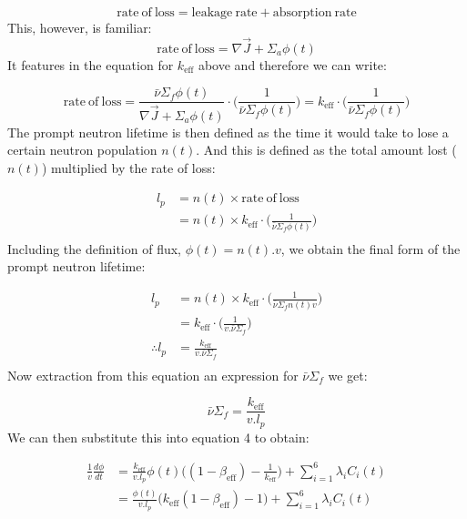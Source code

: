 \documentclass[11pt,letterpaper,titlepage]{article}
\begin{document}
$$
\mathrm{rate \ of \ loss} = \mathrm{leakage \ rate + absorption \ rate}
$$
\noindent
This, however, is familiar:
$$
\mathrm{rate \ of \ loss} = \nabla \vec{J} + \Sigma_a \phi(t)
$$
\noindent
It features in the equation for $k_{\mathrm{eff}}$ above and therefore we can write:

$$
\mathrm{rate \ of \ loss}=\frac{\bar{\nu} \Sigma_f \phi (t) }{\nabla \vec{J} + \Sigma_a \phi(t)}\cdot \biggr(   \frac{1}{\bar{\nu} \Sigma_f \phi (t)}  \biggr) = k_{\mathrm{eff}}\cdot \biggr(   \frac{1}{\bar{\nu} \Sigma_f \phi (t)}  \biggr)
$$
The prompt neutron lifetime is then defined as the time it would take to lose a certain neutron population $n(t)$. And this is defined as the total amount lost ($n(t)$) multiplied by the rate of loss:

\begin{equation*}
\begin{aligned}
l_p &=n(t)\times \mathrm{rate \ of \ loss} \\
    &=n(t)\times k_{\mathrm{eff}}\cdot \biggr(   \frac{1}{\bar{\nu} \Sigma_f \phi (t)}  \biggr)\\
\end{aligned}
\end{equation*}
\noindent
Including the definition of flux, $\phi(t)=n(t).v$, we obtain the final form of the prompt neutron lifetime:

\begin{equation*}
\begin{aligned}
l_p&=n(t)\times k_{\mathrm{eff}}\cdot \biggr(   \frac{1}{\bar{\nu} \Sigma_f n(t)v}  \biggr) \\
   &=k_{\mathrm{eff}}\cdot \biggr(   \frac{1}{v.\bar{\nu} \Sigma_f }  \biggr) \\
\therefore l_p &=\frac{k_{\mathrm{eff}}}{v.\bar{\nu} \Sigma_f} \\
\end{aligned}
\end{equation*}
\noindent
Now extraction from this equation an expression for $\bar{\nu} \Sigma_f$ we get:

$$
\bar{\nu} \Sigma_f=\frac{k_{\mathrm{eff}}}{v.l_p}
$$
\noindent
We can then substitute this into equation 4 to obtain:

\begin{equation}
\begin{aligned}
\frac{1}{v}\frac{d\phi}{dt}&=\frac{k_{\mathrm{eff}}}{v.l_p} \phi (t)\biggr((1-\beta_{\mathrm{eff}})-\frac{1}{k_{\mathrm{eff}}}\biggr) + \sum_{i=1}^6 \lambda_i C_i (t) \\
&=\frac{\phi(t)}{v.l_p}\biggr(k_{\mathrm{eff}}(1-\beta_{\mathrm{eff}})-1\biggr) + \sum_{i=1}^6 \lambda_i C_i (t) \\
\end{aligned}
\end{equation}
\end{document}
